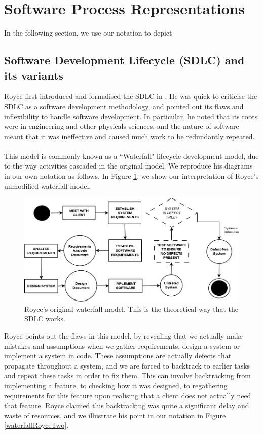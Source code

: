 \section{Software Process Representations} \label{diagrams}

In the following section, we use our notation to depict 

\subsection{Software Development Lifecycle (SDLC) and its variants}
Royce first introduced and formalised the SDLC in
\cite{Royce:1987:MDL:41765.41801}.
He was quick to criticise the SDLC as a software development methodology, and pointed out its flaws
and inflexibility to handle software development.
In particular, he noted that its roots were in engineering and other physicals sciences, and the
nature of software meant that it was ineffective and caused much work to be redundantly repeated.\\
\\
This model is commonly known as a ``Waterfall" lifecycle development model, due to the way
activities cascaded in the original model.
We reproduce his diagrams in our own notation as follows.
In Figure \ref{waterfallRoyceOne}, we show our interpretation of Royce's unmodified waterfall model.

\begin{figure}[ht!]
	\centering
	\includegraphics[scale=0.3]{media/WaterfallRoyceOne}
	\caption{Royce's original waterfall model. This is the theoretical way that the SDLC works.}
	\label{waterfallRoyceOne}
\end{figure}

Royce points out the flaws in this model, by revealing that we actually make mistakes and
assumptions when we gather requirements, design a system or implement a system in code.
These assumptions are actually defects that propagate throughout a system, and we are forced to
backtrack to earlier tasks and repeat these tasks in order to fix them.
This can involve backtracking from implementing a feature, to checking how it was designed, to
regathering requirements for this feature upon realising that a client does not actually need that
feature.
Royce claimed this backtracking was quite a significant delay and waste of resources, and we
illustrate his point in our notation in Figure \ref{waterfallRoyceTwo}.


